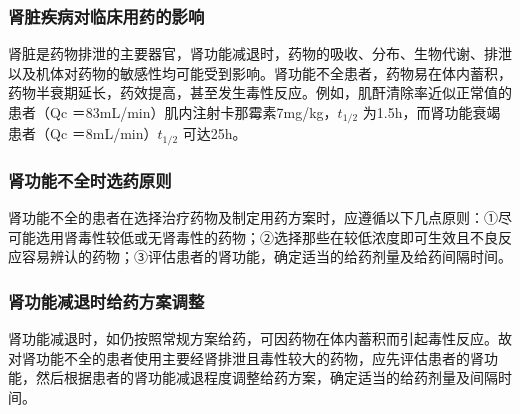 \subsubsection{肾脏疾病对临床用药的影响}

肾脏是药物排泄的主要器官，肾功能减退时，药物的吸收、分布、生物代谢、排泄以及机体对药物的敏感性均可能受到影响。肾功能不全患者，药物易在体内蓄积，药物半衰期延长，药效提高，甚至发生毒性反应。例如，肌酐清除率近似正常值的患者（{Qc}
＝83mL/min）肌内注射卡那霉素7mg/kg，$t_{1/2}$
为1.5h，而肾功能衰竭患者（{Qc} ＝8mL/min）$t_{1/2}$ 可达25h。

\subsubsection{肾功能不全时选药原则}

肾功能不全的患者在选择治疗药物及制定用药方案时，应遵循以下几点原则：①尽可能选用肾毒性较低或无肾毒性的药物；②选择那些在较低浓度即可生效且不良反应容易辨认的药物；③评估患者的肾功能，确定适当的给药剂量及给药间隔时间。

\subsubsection{肾功能减退时给药方案调整}

肾功能减退时，如仍按照常规方案给药，可因药物在体内蓄积而引起毒性反应。故对肾功能不全的患者使用主要经肾排泄且毒性较大的药物，应先评估患者的肾功能，然后根据患者的肾功能减退程度调整给药方案，确定适当的给药剂量及间隔时间。